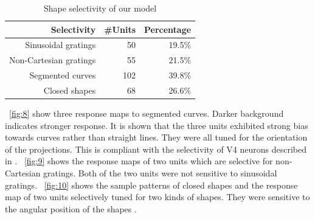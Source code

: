 \documentclass[twocolumn]{article}
\begin{document}
\begin{table}[h]
\caption{Shape selectivity of our model}
\centering
\begin{tabular}{rrr}
\toprule
Selectivity & \#Units & Percentage \\
\midrule
Sinusoidal gratings & 50 & 19.5\% \\
Non-Cartesian gratings & 55 & 21.5\% \\
Segmented curves & 102 & 39.8\% \\
Closed shapes & 68 & 26.6\% \\
\bottomrule
\end{tabular}
\label{tab:1}
\end{table}

\figurename~\ref{fig:8} show three response maps to segmented curves.
Darker background indicates stronger response.
It is shown that the three units exhibited strong bias towards curves rather than straight lines.
They were all tuned for the orientation of the projections.
This is compliant with the selectivity of V4 neurons described in \cite{pasupathy1999}.
\figurename~\ref{fig:9} shows the response maps of two units which are selective for non-Cartesian gratings.
Both of the two units were not sensitive to sinusoidal gratings.
\figurename~\ref{fig:10} shows the sample patterns of closed shapes and the response map of two units selectively tuned for two kinds of shapes.
They were sensitive to the angular position of the shapes \cite{pasupathy2001}.
\end{document}
